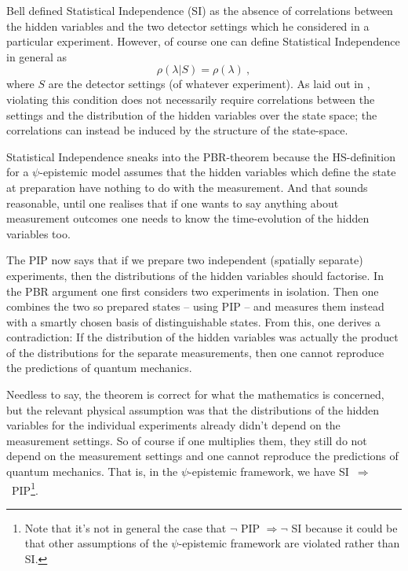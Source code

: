 \documentclass[superscriptaddress,floatfix,nofootinbib,12pt]{revtex4-2}
\begin{document}
Bell defined Statistical Independence ({\sc SI}) as the absence of correlations between the hidden variables and the two detector settings which he considered in a particular experiment. However, of course one can define Statistical Independence in general as 
\begin{equation}
    \rho(\lambda | S) = \rho(\lambda)~,
\end{equation}
where $S$ are the detector settings (of whatever experiment). As laid out in \cite{Hance2021StatInd}, violating this condition does not necessarily require correlations between the settings and the distribution of the hidden variables over the state space; the correlations can instead be induced by the structure of the state-space. 

Statistical Independence sneaks into the {\sc PBR}-theorem because the HS-definition for a $\psi$-epistemic model assumes that the hidden variables which define the state at preparation have nothing to do with the measurement. And that sounds reasonable, until one realises that if one wants to say anything about measurement outcomes one needs to know the time-evolution of the hidden variables too. 

The {\sc PIP} now says that if we prepare two independent (spatially separate) experiments, then the distributions of the hidden variables should factorise. In the {\sc PBR} argument one first considers two experiments in isolation. Then one combines the two so prepared states -- using {\sc PIP} -- and measures them instead with a smartly chosen basis of distinguishable states. From this, one derives a contradiction: If the distribution of the hidden variables was actually the product of the distributions for the separate measurements, then one cannot reproduce the predictions of quantum mechanics. 

Needless to say, the theorem is correct for what the mathematics is concerned, but the relevant physical assumption was that the distributions of the hidden variables for the individual experiments already didn't depend on the measurement settings. So of course if one multiplies them, they still do not depend on the measurement settings and one cannot reproduce the predictions of quantum mechanics. That is, in the $\psi$-epistemic framework, we have {\sc SI}~$\Rightarrow$~{\sc PIP}\footnote{Note that it's not in general the case that $\neg$ {\sc PIP} $\Rightarrow \neg$ SI because it could be that other assumptions of the $\psi$-epistemic framework are violated rather than SI.}.  
\end{document}
